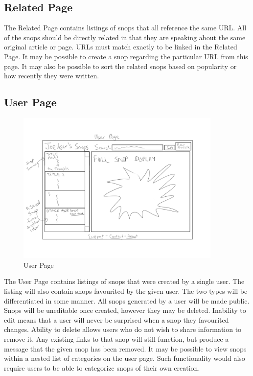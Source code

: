 \documentclass[11pt]{article}
\begin{document}
\subsection{Related Page}
The Related Page contains listings of snops that all reference the same URL. All of the snops should be directly related in that they are speaking about the same original article or page. URLs must match exactly to be linked in the Related Page. It may be possible to create a snop regarding the particular URL from this page. It may also be possible to sort the related snops based on popularity or how recently they were written.
\subsection{User Page}
\begin{figure}[htb]
\begin{center}
\includegraphics[width=0.9\textwidth]{user_page.png}
\caption{User Page}
\label{fig:fig_user_page}
\end{center}
\end{figure}
The User Page contains listings of snops that were created by a single user. The listing will also contain snops favourited by the given user. The two types will be differentiated in some manner. All snops generated by a user will be made public. Snops will be uneditable once created, however they may be deleted. Inability to edit means that a user will never be surprised when a snop they favourited changes. Ability to delete allows users who do not wish to share information to remove it. Any existing links to that snop will still function, but produce a message that the given snop has been removed. It may be possible to view snops within a nested list of categories on the user page. Such functionality would also require users to be able to categorize snops of their own creation.
\end{document}
